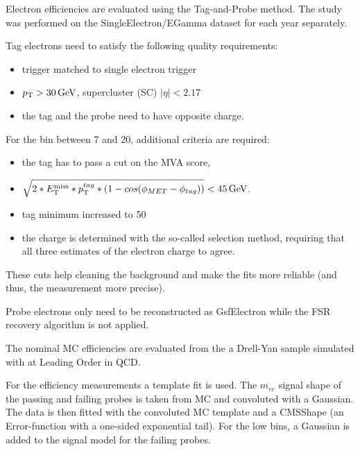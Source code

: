 Electron efficiencies are evaluated using the Tag-and-Probe method.
The study was performed on the SingleElectron/EGamma dataset for each year separately.

Tag electrons need to satisfy the following quality requirements:
\begin{itemize}
\item trigger matched to single electron trigger
\item $p_{\mathrm{T}} > 30 \,\text{Ge\hspace{-.08em}V}$, supercluster (SC) $|\eta| < 2.17$%
\item the tag and the probe need to have opposite charge.
\end{itemize}

For the bin between 7 and 20\GeV, additional criteria are required:
\begin{itemize}
\item the tag has to pass a cut on the MVA score,
\item $\sqrt{2*E_{\mathrm{T}}^{\text{miss}}*p_{\mathrm{T}}^{tag}*(1-cos(\phi_{MET}-\phi_{tag}))} < 45 \,\text{Ge\hspace{-.08em}V}$.
\item tag minimum \pt increased to 50\GeV
\item the charge is determined with the so-called selection method, requiring that all three estimates of the electron charge to agree. 
\end{itemize}
These cuts help cleaning the background and make the fits more reliable (and thus, the measurement more precise).

Probe electrons only need to be reconstructed as GsfElectron while the FSR recovery algorithm is not applied.

The nominal MC efficiencies are evaluated from the a Drell-Yan sample simulated with \MADGRAPH at Leading Order in QCD.

For the efficiency measurements a template fit is used.
The $m_{ee}$ signal shape of the passing and failing probes is taken from MC and convoluted with a Gaussian.
The data is then fitted with the convoluted MC template and a CMSShape (an Error-function with a one-sided exponential tail).
For the low \pt bins, a Gaussian is added to the signal model for the failing probes.



